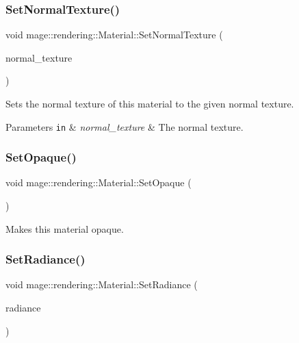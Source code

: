 \subsubsection{\texorpdfstring{Set\+Normal\+Texture()}{SetNormalTexture()}}
{\footnotesize\ttfamily void mage\+::rendering\+::\+Material\+::\+Set\+Normal\+Texture (\begin{DoxyParamCaption}\item[{\hyperlink{namespacemage_1_1rendering_a6f3ae54f825328465b0cdde0f0de4a36}{Texture\+Ptr}}]{normal\+\_\+texture }\end{DoxyParamCaption})}

Sets the normal texture of this material to the given normal texture.


\begin{DoxyParams}[1]{Parameters}
\mbox{\tt in}  & {\em normal\+\_\+texture} & The normal texture. \\
\hline
\end{DoxyParams}
\hypertarget{classmage_1_1rendering_1_1_material_a23741c39e6ad9a8d12b7793bc3da4131}{}\label{classmage_1_1rendering_1_1_material_a23741c39e6ad9a8d12b7793bc3da4131} 
\subsubsection{\texorpdfstring{Set\+Opaque()}{SetOpaque()}}
{\footnotesize\ttfamily void mage\+::rendering\+::\+Material\+::\+Set\+Opaque (\begin{DoxyParamCaption}{ }\end{DoxyParamCaption})\hspace{0.3cm}{\ttfamily [noexcept]}}

Makes this material opaque. \hypertarget{classmage_1_1rendering_1_1_material_ae41261db79de572b75e2615abadc2aaa}{}\label{classmage_1_1rendering_1_1_material_ae41261db79de572b75e2615abadc2aaa} 
\subsubsection{\texorpdfstring{Set\+Radiance()}{SetRadiance()}}
{\footnotesize\ttfamily void mage\+::rendering\+::\+Material\+::\+Set\+Radiance (\begin{DoxyParamCaption}\item[{\hyperlink{namespacemage_aa97e833b45f06d60a0a9c4fc22ae02c0}{F32}}]{radiance }\end{DoxyParamCaption})\hspace{0.3cm}{\ttfamily [noexcept]}}

